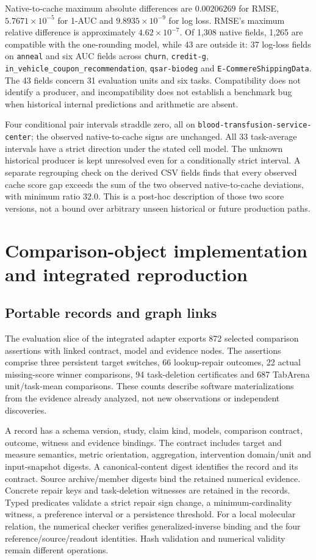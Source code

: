 Native-to-cache maximum absolute differences are $0.00206269$ for RMSE, $5.7671\times10^{-5}$ for 1-AUC and $9.8935\times10^{-9}$ for log loss. RMSE's maximum relative difference is approximately $4.62\times10^{-7}$. Of 1,308 native fields, 1,265 are compatible with the one-rounding model, while 43 are outside it: 37 log-loss fields on \texttt{anneal} and six AUC fields across \texttt{churn}, \texttt{credit-g}, \texttt{in\_vehicle\_coupon\_recommendation}, \texttt{qsar-biodeg} and \texttt{E-CommereShippingData}. The 43 fields concern 31 evaluation units and six tasks. Compatibility does not identify a producer, and incompatibility does not establish a benchmark bug when historical internal predictions and arithmetic are absent.

Four conditional pair intervals straddle zero, all on \texttt{blood-transfusion-service-center}; the observed native-to-cache signs are unchanged. All 33 task-average intervals have a strict direction under the stated cell model. The unknown historical producer is kept unresolved even for a conditionally strict interval. A separate regrouping check on the derived CSV fields finds that every observed cache score gap exceeds the sum of the two observed native-to-cache deviations, with minimum ratio $32.0$. This is a post-hoc description of those two score versions, not a bound over arbitrary unseen historical or future production paths.

\section{Comparison-object implementation and integrated reproduction}\label{sec:s21}
\subsection{Portable records and graph links}
The evaluation slice of the integrated adapter exports 872 selected comparison assertions with linked contract, model and evidence nodes. The assertions comprise three persistent target switches, 66 lookup-repair outcomes, 22 actual missing-score winner comparisons, 94 task-deletion certificates and 687 TabArena unit/task-mean comparisons. These counts describe software materializations from the evidence already analyzed, not new observations or independent discoveries.

A record has a schema version, study, claim kind, models, comparison contract, outcome, witness and evidence bindings. The contract includes target and measure semantics, metric orientation, aggregation, intervention domain/unit and input-snapshot digests. A canonical-content digest identifies the record and its contract. Source archive/member digests bind the retained numerical evidence. Concrete repair keys and task-deletion witnesses are retained in the records. Typed predicates validate a strict repair sign change, a minimum-cardinality witness, a preference interval or a persistence threshold. For a local molecular relation, the numerical checker verifies generalized-inverse binding and the four reference/source/readout identities. Hash validation and numerical validity remain different operations.

